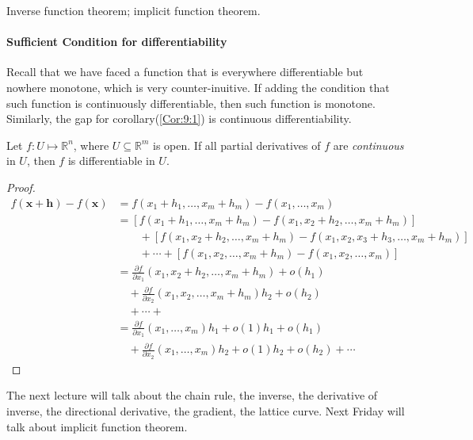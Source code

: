 Inverse function theorem; implicit function theorem.

\paragraph{Sufficient Condition for differentiability}
Recall that we have faced a function that is everywhere differentiable but nowhere monotone, which is very counter-inuitive. If adding the condition that such function is continuously differentiable, then such function is monotone. Similarly, the gap for corollary(\ref{Cor:9:1}) is continuous differentiability.
\begin{theorem}
Let $f:U\mapsto\mathbb{R}^n$, where $U\subseteq\mathbb{R}^m$ is open. If all partial derivatives of $f$ are \emph{continuous} in $U$, then $f$ is differentiable in $U$.
\end{theorem}
\begin{proof}
\begin{align*}
f(\bm x+\bm h) - f(\bm x) &=f(x_1+h_1,\dots,x_m+h_m) - f(x_1,\dots,x_m) \\
&=[f(x_1+h_1,\dots,x_m+h_m) - f(x_1,x_2+h_2,\dots,x_m+h_m)]\\
&\qquad +[f(x_1,x_2+h_2,\dots,x_m+h_m)-f(x_1,x_2,x_3+h_3,\dots,x_m+h_m)]\\
&\qquad+\cdots+
[f(x_1,x_2,\dots,x_m+h_m) - f(x_1,x_2,\dots,x_m)]\\
&=\frac{\partial f}{\partial x_1}(x_1,x_2+h_2,\dots,x_m+h_m)+o(h_1)\\
&\quad +\frac{\partial f}{\partial x_2}(x_1,x_2,\dots,x_m+h_m)h_2+o(h_2)\\
&\quad+\cdots+\\
&=\frac{\partial f}{\partial x_1}(x_1,\dots,x_m)h_1 +o(1)h_1+o(h_1)\\
&\quad +\frac{\partial f}{\partial x_2}(x_1,\dots,x_m)h_2 +o(1)h_2+o(h_2)+\cdots
\end{align*}



\end{proof}


The next lecture will talk about the chain rule, the inverse, the derivative of inverse, the directional derivative, the gradient, the lattice curve. Next Friday will talk about implicit function theorem. 







